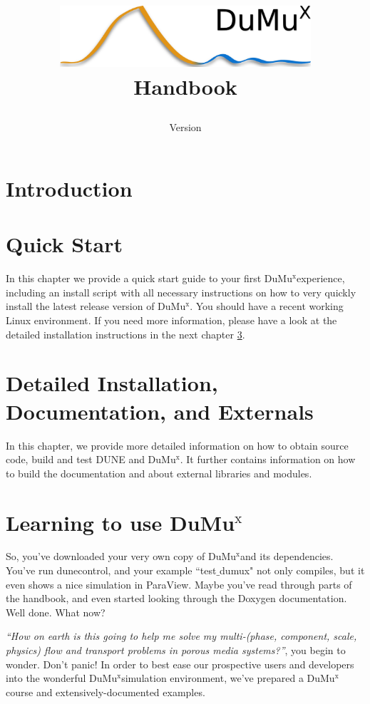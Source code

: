 \documentclass[11pt,a4paper,headinclude,footinclude,DIV16]{scrreprt}
\title{
\begin{center}
\includegraphics[width=0.7\textwidth]{../logo/dumux_logo_hires_whitebg.png}
\\[3cm]
{\Huge Handbook}
\end{center}
}
\author{}
\date{Version \DumuxVersion}
\newcommand{\Dune}{{DUNE}\xspace}
\newcommand{\Dumux}{\texorpdfstring{Du\-Mu$^\text{x}$\xspace}{DuMuX\xspace}}
\begin{document}
\maketitle

\setcounter{tocdepth}{1}
\tableofcontents
\newpage

\chapter{Introduction}


\chapter{Quick Start}\label{quick-install}
In this chapter we provide a quick start guide to
your first \Dumux experience, including an install script with all necessary instructions
on how to very quickly install the latest release version of \Dumux.
You should have a recent working Linux environment.
If you need more information, please have a look at the detailed installation
instructions in the next chapter \ref{detailed-install}.


\chapter{Detailed Installation, Documentation, and Externals}\label{detailed-install}
In this chapter, we provide more detailed information on how to obtain source code, build and test \Dune and \Dumux.
It further contains information on
how to build the documentation and about external libraries and modules.


\chapter{Learning to use \Dumux}\label{chp:tutorial}
So, you've downloaded your very own copy of \Dumux and its dependencies.
You've run dunecontrol, and your example ``test$\_$dumux" not only compiles,
but it even shows a nice simulation in ParaView.
Maybe you've read through parts of the handbook, and even started looking
through the Doxygen documentation.
Well done. What now? \par
%
\textit{``How on earth is this going to help me solve my multi-(phase, component,
	scale, physics) flow and transport problems in porous media systems?''}, you begin to wonder.
Don't panic! In order to best ease our prospective users and developers into the
wonderful \Dumux simulation environment, we've prepared a \Dumux course and extensively-documented examples.



\end{document}
